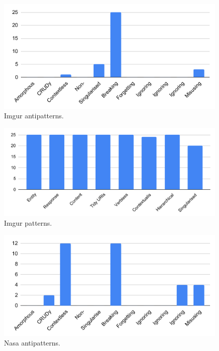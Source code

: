 \documentclass[a4paper,12pt]{article}
\begin{document}
\begin{figure}[!h]
\begin{center}
\includegraphics[keepaspectratio,scale=0.8]{Template_report_LaTeX_EN/img/barchart/imgurBarAnti.pdf}
\caption{Imgur antipatterns.}
\label{fig:imgurBarAnti}
\end{center}
\end{figure}

\begin{figure}[!h]
\begin{center}
\includegraphics[keepaspectratio,scale=0.8]{Template_report_LaTeX_EN/img/barchart/imgurBarPatt.pdf}
\caption{Imgur patterns.}
\label{fig:imgurBarPatt}
\end{center}
\end{figure}

\begin{figure}[!h]
\begin{center}
\includegraphics[keepaspectratio,scale=0.8]{Template_report_LaTeX_EN/img/barchart/nasaBarAnti.pdf}
\caption{Nasa antipatterns.}
\label{fig:nasaBarAnti}
\end{center}
\end{figure}
\end{document}
